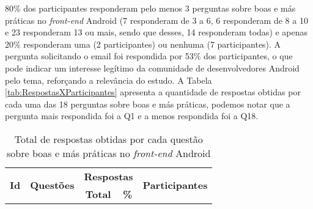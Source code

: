 80\% dos participantes responderam pelo menos 3 perguntas sobre boas e m\'as pr\'aticas no \textit{front-end} Android (7 responderam de 3 a 6, 6 responderam de 8 a 10 e 23 responderam 13 ou mais, sendo que desses, 14 responderam todas) e apenas 20\% responderam uma (2 participantes) ou nenhuma (7 participantes). A pergunta solicitando o email foi respondida por 53\% dos participantes, o que pode indicar um interesse leg\'itimo da comunidade de desenvolvedores Android pelo tema, refor\c{c}ando a relev\^ancia do estudo. A Tabela \ref{tab:RespostasXParticipantes} apresenta a quantidade de respostas obtidas por cada uma das 18 perguntas sobre boas e m\'as pr\'aticas, podemos notar que a pergunta mais respondida foi a Q1 e a menos respondida foi a Q18.

\begin{table*}[t]
\centering
\caption{Total de respostas obtidas por cada quest\~ao sobre boas e m\'as pr\'aticas no \textit{front-end} Android}
\footnotesize
\begin{tabular}{@{}lp{9cm}ccp{5.5cm}@{}}
\toprule
	\multirow{2}{*}{\textbf{Id}}  & \multicolumn{1}{c}{\multirow{2}{*}{\textbf{Quest\~oes}}} 	& \multicolumn{2}{c}{\textbf{Respostas}}	& \multicolumn{1}{c}{\multirow{2}{*}{\textbf{Participantes}}} \\ \cmidrule{3-4}
					 & 								& \textbf{Total} & \textbf{\%} & \\
\hline


\end{tabular}
\end{table*}
